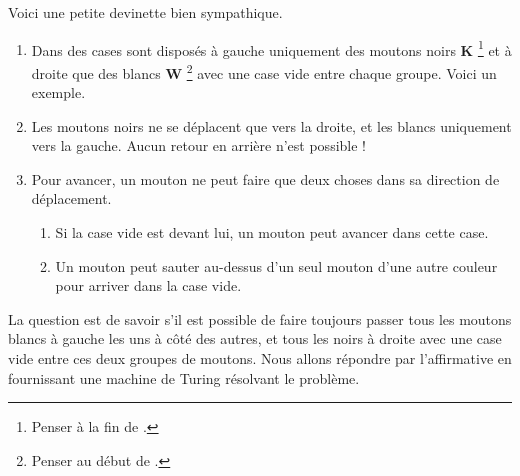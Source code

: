 Voici une petite devinette bien sympathique.

\begin{enumerate}
	\item Dans des cases sont disposés à gauche uniquement des moutons noirs \textbf{K}
	      \footnote{
	      	   Penser à la fin de .
	      }
	      et à droite que des blancs \textbf{W}
	      \footnote{
	      	   Penser au début de .
	      }
	      avec une case vide entre chaque groupe. Voici un exemple.
		  \begin{center}
			\boxedB\boxedB\boxedB%
			\emptybox%
			\boxedW\boxedW%
		  \end{center}


	\item Les moutons noirs ne se déplacent que vers la droite, et les blancs uniquement vers la gauche. Aucun retour en arrière n'est possible !


	\item Pour avancer, un mouton ne peut faire que deux choses dans sa direction de déplacement.
	\begin{enumerate}
		\item Si la case vide est devant lui, un mouton peut avancer dans cette case.

		\item Un mouton peut sauter au-dessus d'un seul mouton d'une autre couleur pour arriver dans la case vide.
	\end{enumerate}
\end{enumerate}


La question est de savoir s'il est possible de faire toujours passer tous les moutons blancs à gauche les uns à côté des autres, et tous les noirs à droite avec une case vide entre ces deux groupes de moutons. Nous allons répondre par l'affirmative en fournissant une machine de Turing résolvant le problème.
